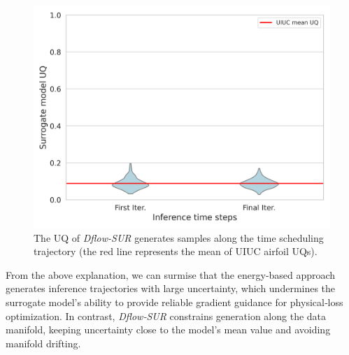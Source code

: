 \begin{figure}[htbp]
    \centering
    \includegraphics[width=0.8\linewidth]{chapter7/fig/dflow_uncertainty_violin.png}
    \caption{The UQ of \textit{Dflow-SUR} generates samples along the time scheduling trajectory (the red line represents the mean of UIUC airfoil UQs).}
    \label{ch7:fig:uqDflowSUR}
\end{figure}

From the above explanation, we can surmise that the energy‐based approach generates inference trajectories with large uncertainty, which undermines the surrogate model’s ability to provide reliable gradient guidance for physical‐loss optimization. In contrast, \textit{Dflow‐SUR} constrains generation along the data manifold, keeping uncertainty close to the model's mean value and avoiding manifold drifting.

